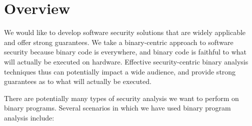 \section{Overview}
\label{sec:goals}

We would like to develop software security solutions that are widely
applicable and offer strong guarantees. We take a binary-centric
approach to software security because binary code is everywhere, and
binary code is faithful to what will actually be executed on
hardware. Effective security-centric binary analysis techniques thus
can potentially impact a wide audience, and provide strong guarantees
as to what will actually be executed.


There are potentially many types of security analysis we want to
perform on binary programs.  Several scenarios in which we have used
binary program analysis include:
